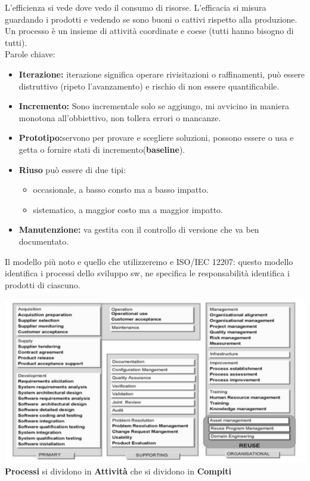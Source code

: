 L'efficienza si vede dove vedo il consumo di risorse. L'efficacia si misura guardando i prodotti e vedendo se sono buoni o cattivi rispetto alla produzione. Un processo è un insieme di attività coordinate e coese (tutti hanno bisogno di tutti).\\
Parole chiave:
\begin{itemize}
	\item\textbf{Iterazione:} iterazione significa operare rivisitazioni o raffinamenti, può essere distruttivo (ripeto l'avanzamento) e rischio di non essere quantificabile.
	\item\textbf{Incremento:} Sono incrementale solo se aggiungo, mi avvicino in maniera monotona all'obbiettivo, non tollera errori o mancanze.
	\item\textbf{Prototipo:}servono per provare e scegliere soluzioni, possono essere o usa e getta o fornire stati di incremento(\textbf{baseline}).
	\item\textbf{Riuso} può essere di due tipi:
	\begin{itemize}
	
		\item occasionale, a basso consto ma a basso impatto.
		\item sistematico, a maggior costo ma a maggior impatto.
	\end{itemize}
	\item \textbf{Manutenzione:} va gestita con il controllo di versione che va ben documentato.
\end{itemize}

Il modello più noto e quello che utilizzeremo e ISO/IEC 12207: questo modello identifica i processi dello sviluppo sw, ne specifica le responsabilità identifica i prodotti di ciascuno.

\includegraphics[width=0.75\columnwidth]{img3} %
\\
\textbf{Processi} si dividono in \textbf{Attività} che si dividono in \textbf{Compiti}

